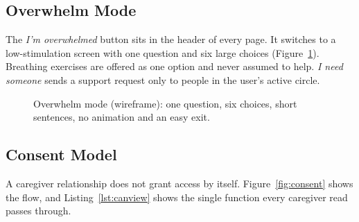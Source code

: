 \documentclass[11pt,a4paper]{article}
\begin{document}
\subsection{Overwhelm Mode}
The \emph{I'm overwhelmed} button sits in the header of every page. It switches to a
low-stimulation screen with one question and six large choices (Figure~\ref{fig:overwhelm}).
Breathing exercises are offered as one option and never assumed to help. \emph{I need someone} sends a
support request only to people in the user's active circle.

\begin{figure}[H]
\centering
{}
\caption{Overwhelm mode (wireframe): one question, six choices, short sentences, no animation and an easy exit.}
\label{fig:overwhelm}
\end{figure}

\subsection{Consent Model}
A caregiver relationship does not grant access by itself. Figure~\ref{fig:consent} shows the flow,
and Listing~\ref{lst:canview} shows the single function every caregiver read passes through.
\end{document}
